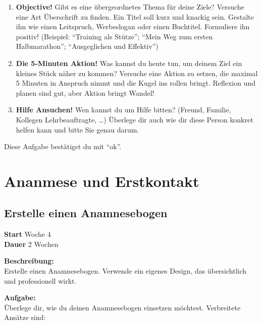 \documentclass[
  letterpaper,
  DIV=11,
  numbers=noendperiod]{scrreprt}
\begin{document}
\begin{enumerate}
\begin{figure}
  \end{figure}%
\item
  \textbf{Objective!} Gibt es eine übergeordnetes Thema für deine Ziele?
  Versuche eine Art Überschrift zu finden. Ein Titel soll kurz und
  knackig sein. Gestalte ihn wie einen Leitspruch, Werbeslogan oder
  einen Buchtitel. Formuliere ihn positiv! (Beispiel: ``Training als
  Stütze''; ``Mein Weg zum ersten Halbmarathon''; ``Ausgeglichen und
  Effektiv'')
\item
  \textbf{Die 5-Minuten Aktion!} Was kannst du heute tun, um deinem Ziel
  ein kleines Stück näher zu kommen? Versuche eine Aktion zu setzen, die
  maximal 5 Minuten in Anspruch nimmt und die Kugel ins rollen bringt.
  Reflexion und planen sind gut, aber Aktion bringt Wandel!
\item
  \textbf{Hilfe Ansuchen!} Wen kannst du um Hilfe bitten? (Freund,
  Familie, Kollegen Lehrbeauftragte, \ldots) Überlege dir auch wie dir
  diese Person konkret helfen kann und bitte Sie genau darum.
\end{enumerate}

Diese Aufgabe bestätigst du mit ``ok''.

\section{Ananmese und Erstkontakt}\label{ananmese-und-erstkontakt}

\subsection{Erstelle einen
Anamnesebogen}\label{erstelle-einen-anamnesebogen}

\textbf{Start} Woche 4\\
\textbf{Dauer} 2 Wochen

\textbf{Beschreibung:}\\
Erstelle einen Anamnesebogen. Verwende ein eigenes Design, das
übersichtlich und professionell wirkt.

\textbf{Aufgabe:}\\
Überlege dir, wie du deinen Anamnesebogen einsetzen möchtest.
Verbreitete Ansätze sind:
\end{document}
